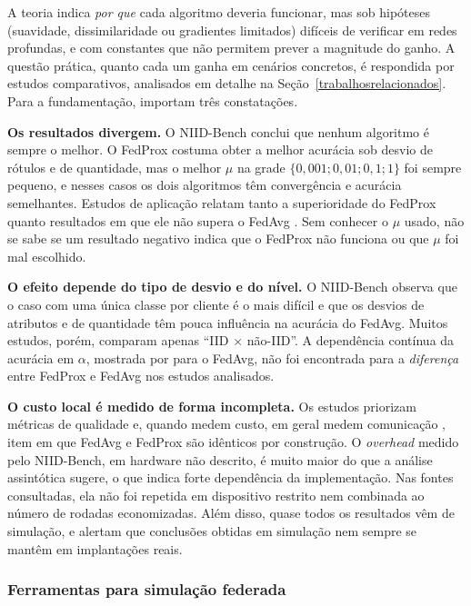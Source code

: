 A teoria indica \emph{por que} cada algoritmo deveria funcionar, mas sob hipóteses (suavidade, dissimilaridade ou gradientes limitados) difíceis de verificar em redes profundas, e com constantes que não permitem prever a magnitude do ganho. A questão prática, quanto cada um ganha em cenários concretos, é respondida por estudos comparativos, analisados em detalhe na Seção~\ref{trabalhosrelacionados}. Para a fundamentação, importam três constatações.

\textbf{Os resultados divergem.} O NIID-Bench \citep{li2022niidbench} conclui que nenhum algoritmo é sempre o melhor. O FedProx costuma obter a melhor acurácia sob desvio de rótulos e de quantidade, mas o melhor $\mu$ na grade $\{0{,}001; 0{,}01; 0{,}1; 1\}$ foi sempre pequeno, e nesses casos os dois algoritmos têm convergência e acurácia semelhantes. Estudos de aplicação relatam tanto a superioridade do FedProx \citep{mahmood2025alzheimer, delehouzee2024crosssilo, julekha2026bangla} quanto resultados em que ele não supera o FedAvg \citep{vajjhula2025har, quintana2026mammography}. Sem conhecer o $\mu$ usado, não se sabe se um resultado negativo indica que o FedProx não funciona ou que $\mu$ foi mal escolhido.

\textbf{O efeito depende do tipo de desvio e do nível.} O NIID-Bench observa que o caso com uma única classe por cliente é o mais difícil e que os desvios de atributos e de quantidade têm pouca influência na acurácia do FedAvg. Muitos estudos, porém, comparam apenas ``IID × não-IID''. A dependência contínua da acurácia em $\alpha$, mostrada por \citet{hsu2019fedavgm} para o FedAvg, não foi encontrada para a \emph{diferença} entre FedProx e FedAvg nos estudos analisados.

\textbf{O custo local é medido de forma incompleta.} Os estudos priorizam métricas de qualidade e, quando medem custo, em geral medem comunicação \citep{bakr2026parkfl, tan2026instruction}, item em que FedAvg e FedProx são idênticos por construção. O \textit{overhead} medido pelo NIID-Bench, em hardware não descrito, é muito maior do que a análise assintótica sugere, o que indica forte dependência da implementação. Nas fontes consultadas, ela não foi repetida em dispositivo restrito nem combinada ao número de rodadas economizadas. Além disso, quase todos os resultados vêm de simulação, e \citet{valli2026beyond} alertam que conclusões obtidas em simulação nem sempre se mantêm em implantações reais.

\subsubsection{Ferramentas para simulação federada}

